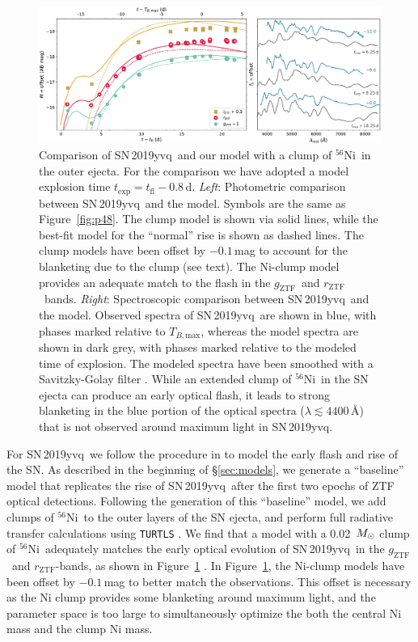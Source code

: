 \documentclass[twocolumn]{aastex63}
\newcommand{\rztf}{$r_\mathrm{ZTF}$}
\newcommand{\gztf}{$g_\mathrm{ZTF}$}
\newcommand{\iztf}{$i_\mathrm{ZTF}$}
\newcommand{\tbmax}{$T_{B,\mathrm{max}}$}
\newcommand{\radni}{$^{56}$Ni}
\newcommand{\sn}{SN\,2019yvq}
\begin{document}
\begin{figure}
    \centering
    \includegraphics[width=\textwidth]{./figures/clump_model.pdf}
    \caption{Comparison of \sn\ and our model with a clump of \radni\ in the
    outer ejecta. For the comparison we have adopted a model explosion time
    $t_\mathrm{exp} = t_\mathrm{fl} - 0.8$\,d. \textit{Left}: Photometric
    comparison between \sn\ and the model. Symbols are the same as
    Figure~\ref{fig:p48}. The clump model is shown via solid lines, while the
    best-fit model for the ``normal'' rise is shown as dashed lines. The clump
    models have been offset by $-0.1$\,mag to account for the blanketing due
    to the clump (see text). The Ni-clump model provides an adequate match to
    the flash in the \gztf\ and \rztf\ bands. \textit{Right}: Spectroscopic
    comparison between \sn\ and the model. Observed spectra of \sn\ are shown
    in blue, with phases marked relative to \tbmax, whereas the model spectra
    are shown in dark grey, with phases marked relative to the modeled time of
    explosion. The modeled spectra have been smoothed with a Savitzky-Golay
    filter \citep{Savitzky64}. While an extended clump of \radni\ in the SN
    ejecta can produce an early optical flash, it leads to strong blanketing
    in the blue portion of the optical spectra ($\lambda \lesssim 4400$\,\AA)
    that is not observed around maximum light in \sn. }
    \label{fig:Ni_bullet}
\end{figure}

For \sn\ we follow the procedure in \citet{Magee20a} to model the early flash
and rise of the SN. As described in the beginning of \S\ref{sec:models}, we
generate a ``baseline'' model that replicates the rise of \sn\ after the first
two epochs of ZTF optical detections. Following the generation of this
``baseline'' model, we add clumps of \radni\ to the outer layers of the SN
ejecta, and perform full radiative transfer calculations using \texttt{TURTLS}
\citep{Magee18}. We find that a model with a 0.02~$M_{\rm{\odot}}$ clump of
\radni\ adequately matches the early optical evolution of \sn\ in the \gztf\
and \rztf-bands, as shown in Figure~\ref{fig:Ni_bullet} \citep[the model
overestimates the \iztf\ flux, which is expected due to a simplifying
assumption of a sharp photosphere in the models, see][for further
details]{Magee20a}. In Figure~\ref{fig:Ni_bullet}, the Ni-clump models have
been offset by $-0.1$\,mag to better match the observations. This offset is
necessary as the Ni clump provides some blanketing around maximum light, and
the parameter space is too large to simultaneously optimize the both the
central Ni mass and the clump Ni mass.
\end{document}
